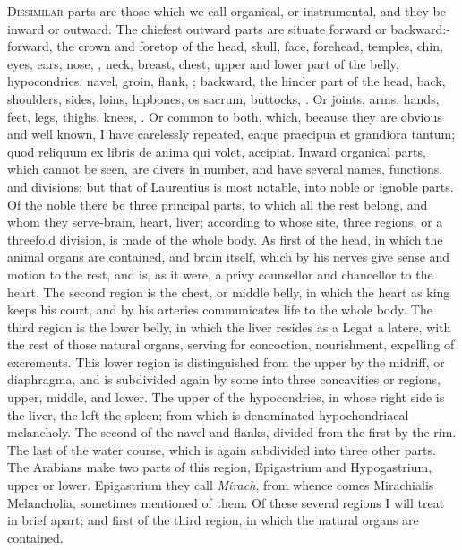 {\lettrine{D}{issimilar} parts are those which we call organical, or instrumental,
and they be inward or outward. The chiefest outward parts are situate
forward or backward:-forward, the crown and foretop of the head, skull,
face, forehead, temples, chin, eyes, ears, nose, \etc{}, neck, breast,
chest, upper and lower part of the belly, hypocondries, navel, groin,
flank, \etc{}; backward, the hinder part of the head, back, shoulders,
sides, loins, hipbones, os sacrum, buttocks, \etc{}. Or joints, arms,
hands, feet, legs, thighs, knees, \etc{}. Or common to both, which, because
they are obvious and well known, I have carelessly repeated, eaque
praecipua et grandiora tantum; quod reliquum ex libris de anima qui
volet, accipiat.
Inward organical parts, which cannot be seen, are divers in number, and
have several names, functions, and divisions; but that of
Laurentius is most notable, into noble or ignoble parts. Of the
noble there be three principal parts, to which all the rest belong, and
whom they serve-brain, heart, liver; according to whose site, three
regions, or a threefold division, is made of the whole body. As first
of the head, in which the animal organs are contained, and brain
itself, which by his nerves give sense and motion to the rest, and is,
as it were, a privy counsellor and chancellor to the heart. The second
region is the chest, or middle belly, in which the heart as king keeps
his court, and by his arteries communicates life to the whole body. The
third region is the lower belly, in which the liver resides as a Legat
a latere, with the rest of those natural organs, serving for
concoction, nourishment, expelling of excrements. This lower region is
distinguished from the upper by the midriff, or diaphragma, and is
subdivided again by some into three concavities or regions, upper,
middle, and lower. The upper of the hypocondries, in whose right side
is the liver, the left the spleen; from which is denominated
hypochondriacal melancholy. The second of the navel and flanks, divided
from the first by the rim. The last of the water course, which is again
subdivided into three other parts. The Arabians make two parts of this
region, Epigastrium and Hypogastrium, upper or lower. Epigastrium they
call \emph{Mirach}, from whence comes Mirachialis Melancholia, sometimes
mentioned of them. Of these several regions I will treat in brief
apart; and first of the third region, in which the natural organs are
contained.
}

